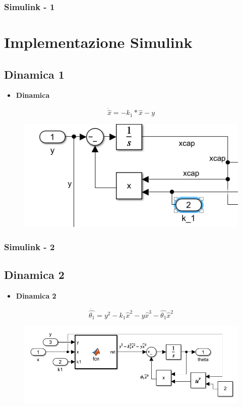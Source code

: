\documentclass{beamer}
\begin{document}
\begin{frame}
    \frametitle{Simulink - 1}
    \section{Implementazione Simulink}
    \subsection{Dinamica 1}
    \begin{itemize}
        \item \textbf{Dinamica}
    \end{itemize}
    \begin{minipage}[t]{0.9\textwidth}
        \begin{equation*}
            \dot{\hat{x}}=-k_{1}*\hat{x}-y
        \end{equation*}
        \begin{figure}
            \includegraphics[scale=0.4]{2022-05-15-17-24-30.png} %
        \end{figure}
    \end{minipage}
\end{frame}
\begin{frame}
    \frametitle{Simulink - 2} %
    \subsection{Dinamica 2}
    \begin{itemize}
        \item \textbf{Dinamica 2}
    \end{itemize}
    \begin{minipage}[t]{0.9\textwidth}
        \begin{equation*}
            \dot{\hat{\theta_{1}}}=y^2-k_{1}\hat{x}^2-y\hat{x}^3-\hat{\theta_{1}}\hat{x}^2
        \end{equation*}
        \begin{figure}
            \includegraphics[scale=0.3]{2022-05-15-17-59-30.png} %
        \end{figure}
    \end{minipage}
\end{frame}
\end{document}
